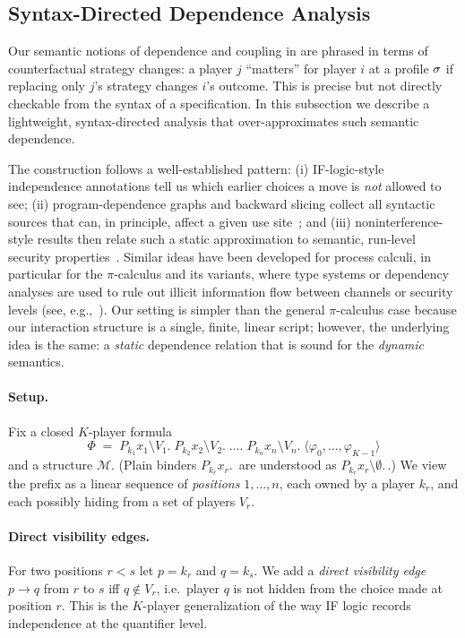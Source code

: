 \subsection{Syntax-Directed Dependence Analysis}
\label{subsec:syntax-dependence}

Our semantic notions of dependence and coupling in  are phrased in terms of counterfactual strategy changes: a player $j$ ``matters'' for player $i$ at a profile $\sigma$ if replacing only $j$'s strategy changes $i$'s outcome. This is precise but not directly checkable from the syntax of a \KFOL specification. In this subsection we describe a lightweight, syntax-directed analysis that over-approximates such semantic dependence.

The construction follows a well-established pattern:
(i) IF-logic-style independence annotations tell us which earlier choices a move is \emph{not} allowed to see;
(ii) program-dependence graphs and backward slicing collect all syntactic sources that can, in principle, affect a given use site~\cite{Weiser1981Slicing};
and (iii) noninterference-style results then relate such a static approximation to semantic, run-level security properties~\cite{goguen1982security}.
Similar ideas have been developed for process calculi, in particular for the $\pi$-calculus and its variants, where type systems or dependency analyses are used to rule out illicit information flow between channels or security levels (see, e.g.,~\cite{honda2000secure}).
Our setting is simpler than the general $\pi$-calculus case because our interaction structure is a single, finite, linear script; however, the underlying idea is the same: a \emph{static} dependence relation that is sound for the \emph{dynamic} semantics.

\paragraph{Setup.}
Fix a closed $K$-player formula
\[
  \Phi \;=\;
  P_{k_1} x_1 \setminus V_1.\;
  P_{k_2} x_2 \setminus V_2.\;
  \dots.\;
  P_{k_n} x_n \setminus V_n.\;
  \langle \varphi_0,\dots,\varphi_{K-1} \rangle
\]
and a structure $\mathcal M$. (Plain binders $P_{k_r} x_r.\,$ are understood as $P_{k_r} x_r \setminus \emptyset.\,$.)
We view the prefix as a linear sequence of \emph{positions} $1,\dots,n$, each owned by a player $k_r$, and each possibly hiding from a set of players $V_r$.

\paragraph{Direct visibility edges.}
For two positions $r < s$ let $p = k_r$ and $q = k_s$.
We add a \emph{direct visibility edge} $p \to q$ from $r$ to $s$ iff $q \notin V_r$, i.e.\ player $q$ is not hidden from the choice made at position $r$.
This is the $K$-player generalization of the way IF logic records independence at the quantifier level.

